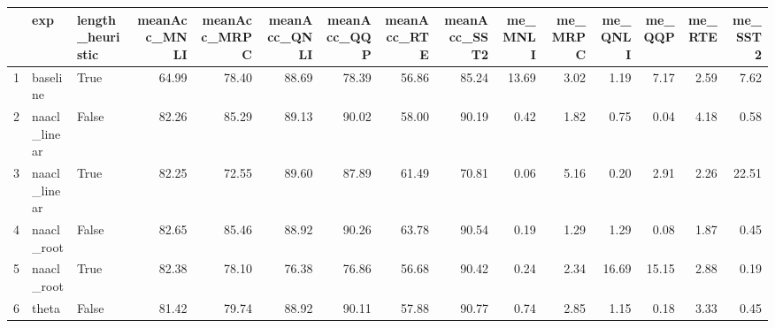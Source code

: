 \begin{table}[ht]
\centering
\begin{tabular}{rllrrrrrrrrrrrr}
  \hline
 & exp & length\_heuristic & meanAcc\_MNLI & meanAcc\_MRPC & meanAcc\_QNLI & meanAcc\_QQP & meanAcc\_RTE & meanAcc\_SST2 & me\_MNLI & me\_MRPC & me\_QNLI & me\_QQP & me\_RTE & me\_SST2 \\ 
  \hline
1 & baseline & True & 64.99 & 78.40 & 88.69 & 78.39 & 56.86 & 85.24 & 13.69 & 3.02 & 1.19 & 7.17 & 2.59 & 7.62 \\ 
  2 & naacl\_linear & False & 82.26 & 85.29 & 89.13 & 90.02 & 58.00 & 90.19 & 0.42 & 1.82 & 0.75 & 0.04 & 4.18 & 0.58 \\ 
  3 & naacl\_linear & True & 82.25 & 72.55 & 89.60 & 87.89 & 61.49 & 70.81 & 0.06 & 5.16 & 0.20 & 2.91 & 2.26 & 22.51 \\ 
  4 & naacl\_root & False & 82.65 & 85.46 & 88.92 & 90.26 & 63.78 & 90.54 & 0.19 & 1.29 & 1.29 & 0.08 & 1.87 & 0.45 \\ 
  5 & naacl\_root & True & 82.38 & 78.10 & 76.38 & 76.86 & 56.68 & 90.42 & 0.24 & 2.34 & 16.69 & 15.15 & 2.88 & 0.19 \\ 
  6 & theta & False & 81.42 & 79.74 & 88.92 & 90.11 & 57.88 & 90.77 & 0.74 & 2.85 & 1.15 & 0.18 & 3.33 & 0.45 \\ 
   \hline
\end{tabular}
\end{table}
